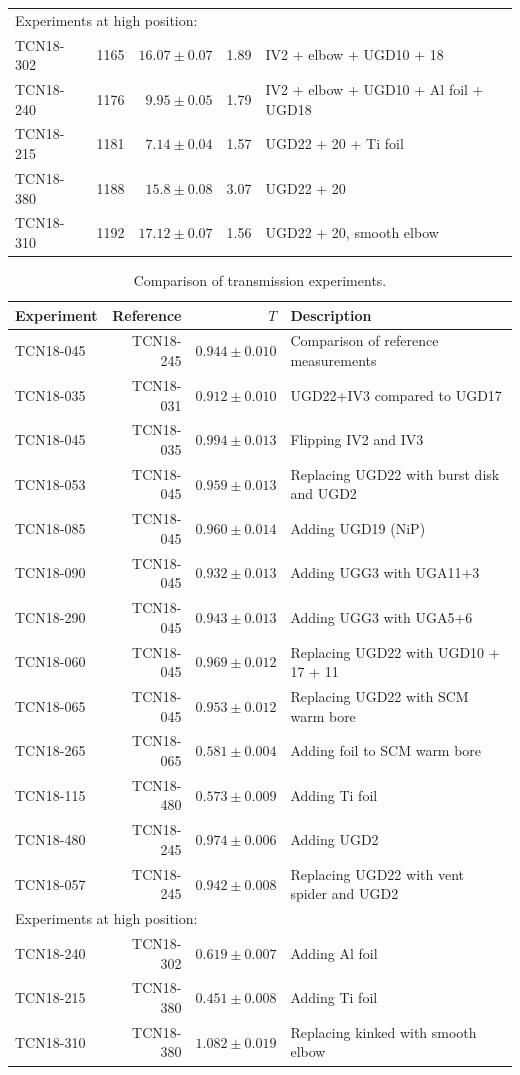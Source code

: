 \documentclass[10pt,letterpaper]{article}
\begin{document}
\begin{table}
\begin{tabular}{l r r r p{}}
\multicolumn{5}{l}{Experiments at high position:} \\
TCN18-302 & 1165 & $16.07 \pm 0.07$ & 1.89 & IV2 + elbow + UGD10 + 18 \\
TCN18-240 & 1176 & $9.95 \pm 0.05$ & 1.79 & IV2 + elbow + UGD10 + Al foil + UGD18 \\
TCN18-215 & 1181 & $7.14 \pm 0.04$ & 1.57 & UGD22 + 20 + Ti foil \\
TCN18-380 & 1188 & $15.8 \pm 0.08$ & 3.07 & UGD22 + 20 \\
TCN18-310 & 1192 & $17.12 \pm 0.07$ & 1.56 & UGD22 + 20, smooth elbow \\
\bottomrule
\end{tabular}
\label{tab:transmission}
\end{table}

\begin{table}
\centering
\caption{Comparison of transmission experiments.}
\begin{tabular}{l r r p{}}
\toprule
Experiment & Reference & $T$ & Description \\
\midrule
TCN18-045 & TCN18-245 & $0.944 \pm 0.010$ & Comparison of reference measurements \\
TCN18-035 & TCN18-031 & $0.912 \pm 0.010$ & UGD22+IV3 compared to UGD17\\
TCN18-045 & TCN18-035 & $0.994 \pm 0.013$ & Flipping IV2 and IV3\\
TCN18-053 & TCN18-045 & $0.959 \pm 0.013$ & Replacing UGD22 with burst disk and UGD2 \\
TCN18-085 & TCN18-045 & $0.960 \pm 0.014$ & Adding UGD19 (NiP) \\
TCN18-090 & TCN18-045 & $0.932 \pm 0.013$ & Adding UGG3 with UGA11+3 \\
TCN18-290 & TCN18-045 & $0.943 \pm 0.013$ & Adding UGG3 with UGA5+6\\
TCN18-060 & TCN18-045 & $0.969 \pm 0.012$ & Replacing UGD22 with UGD10 + 17 + 11 \\
TCN18-065 & TCN18-045 & $0.953 \pm 0.012$ & Replacing UGD22 with SCM warm bore \\
TCN18-265 & TCN18-065 & $0.581 \pm 0.004$ & Adding foil to SCM warm bore \\
TCN18-115 & TCN18-480 & $0.573 \pm 0.009$ & Adding Ti foil \\
TCN18-480 & TCN18-245 & $0.974 \pm 0.006$ & Adding UGD2 \\
TCN18-057 & TCN18-245 & $0.942 \pm 0.008$ & Replacing UGD22 with vent spider and UGD2 \\
\midrule
\multicolumn{4}{l}{Experiments at high position:} \\
TCN18-240 & TCN18-302 & $0.619 \pm 0.007$ & Adding Al foil \\
TCN18-215 & TCN18-380 & $0.451 \pm 0.008$ & Adding Ti foil \\
TCN18-310 & TCN18-380 & $1.082 \pm 0.019$ & Replacing kinked with smooth elbow\\
\bottomrule
\end{tabular}
\label{tab:transmission_comparison}
\end{table}
\end{document}
